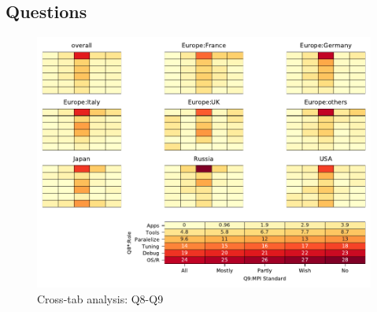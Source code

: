 
\subsection{Questions}


\begin{figure}
\begin{center}
\includegraphics[width=12cm]{../pdfs/Q8-Q9.pdf}
\caption{Cross-tab analysis: Q8-Q9}
\label{fig:Q8-Q9}
\end{center}
\end{figure}
